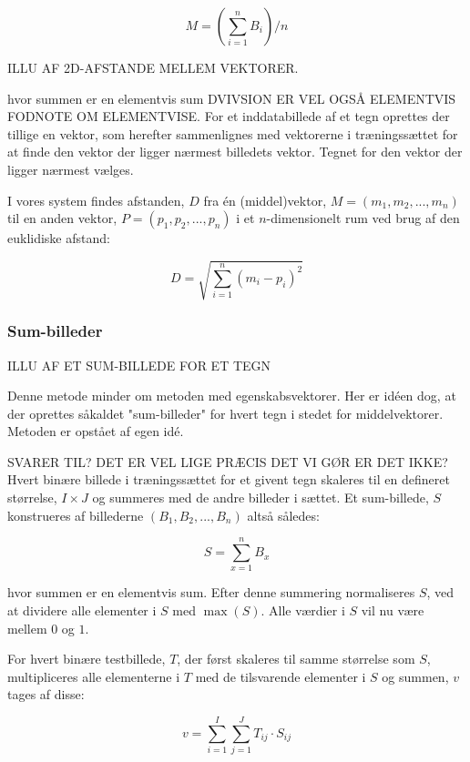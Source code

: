 \begin{displaymath}
	M = (\sum_{i=1}^{n}B_i)/n
\end{displaymath}

ILLU AF 2D-AFSTANDE MELLEM VEKTORER.

hvor summen er en elementvis sum DVIVSION ER VEL OGSÅ ELEMENTVIS FODNOTE OM ELEMENTVISE. For et inddatabillede af et tegn oprettes der tillige en vektor, som herefter sammenlignes med vektorerne i træningssættet for at finde den vektor der ligger nærmest billedets vektor. Tegnet for den vektor der ligger nærmest vælges.

I vores system findes afstanden, $D$ fra én (middel)vektor, $M = (m_{1},m_{2},...,m_{n})$ til en anden vektor, $P = (p_{1},p_{2},...,p_{n})$ i et $n$-dimensionelt rum ved brug af den euklidiske afstand\cite{wiki_euclid}:

\begin{displaymath}
	D = \sqrt{\sum_{i=1}^{n}(m_{i}-p_{i})^{2}}
\end{displaymath}

\subsubsection{Sum-billeder}

ILLU AF ET SUM-BILLEDE FOR ET TEGN

Denne metode minder om metoden med egenskabsvektorer. Her er idéen dog, at der oprettes såkaldet "sum-billeder" for hvert tegn i stedet for middelvektorer. Metoden er opstået af egen idé.

SVARER TIL? DET ER VEL LIGE PRÆCIS DET VI GØR ER DET IKKE?
Hvert binære billede i træningssættet for et givent tegn skaleres til en defineret størrelse, $I \times J$ og summeres med de andre billeder i sættet. Et sum-billede, $S$ konstrueres af billederne $(B_{1},B_{2},...,B_{n})$ altså således:

\begin{displaymath}
	S = \sum_{x=1}^n{B_x}
\end{displaymath}

hvor summen er en elementvis sum. Efter denne summering normaliseres $S$, ved at dividere alle elementer i $S$ med $\max{(S)}$. Alle værdier i $S$ vil nu være mellem $0$ og $1$.

For hvert binære testbillede, $T$, der først skaleres til samme størrelse som $S$, multipliceres alle elementerne i $T$ med de tilsvarende elementer i $S$ og summen, $v$ tages af disse:

\begin{displaymath}
	v = \sum_{i=1}^I{\sum_{j=1}^J{T_{ij} \cdot S_{ij}}}
\end{displaymath}

